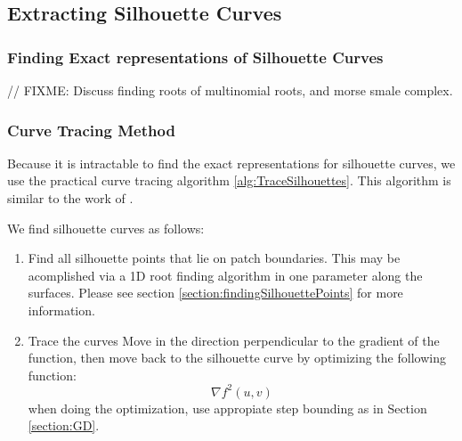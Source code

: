 \documentclass[12pt, letterpaper]{article}
\begin{document}
	\subsection{Extracting Silhouette Curves}

		\subsubsection{Finding Exact representations of Silhouette Curves}
			// FIXME: Discuss finding roots of multinomial roots, and morse smale complex.
	
		\subsubsection{Curve Tracing Method}

			Because it is intractable to find the exact representations for silhouette curves, we use the practical curve tracing algorithm \ref{alg:TraceSilhouettes}.
			This algorithm is similar to the work of \cite{XJY98}.

			We find silhouette curves as follows:

			\begin{enumerate}
			\item Find all silhouette points that lie on patch boundaries. This may be acomplished via a 1D root finding algorithm in one parameter along the surfaces. 
				Please see section \ref{section:findingSilhouettePoints} for more information.
			\item Trace the curves
				Move in the direction perpendicular to the gradient of the function, then move back to the silhouette curve by optimizing the following function:
			$$\nabla f^{2}(u, v)$$ when doing the optimization, use appropiate step bounding as in Section \ref{section:GD}.
			\end{enumerate}
\end{document}
